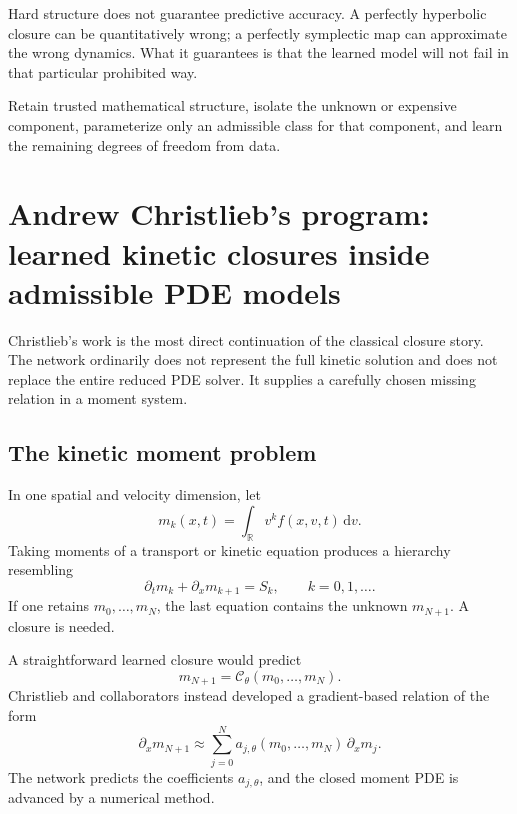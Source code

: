 \documentclass[11pt]{article}
\newcommand{\R}{\mathbb{R}}
\newcommand{\C}{\mathcal{C}}
\newcommand{\dd}{\,\mathrm{d}}
\begin{document}
Hard structure does not guarantee predictive accuracy. A perfectly hyperbolic closure can be quantitatively wrong; a perfectly symplectic map can approximate the wrong dynamics. What it guarantees is that the learned model will not fail in that particular prohibited way.

\begin{takeaway}
Retain trusted mathematical structure, isolate the unknown or expensive component, parameterize only an admissible class for that component, and learn the remaining degrees of freedom from data.
\end{takeaway}

\section{Andrew Christlieb's program: learned kinetic closures inside admissible PDE models}

Christlieb's work is the most direct continuation of the classical closure story. The network ordinarily does not represent the full kinetic solution and does not replace the entire reduced PDE solver. It supplies a carefully chosen missing relation in a moment system.

\subsection{The kinetic moment problem}

In one spatial and velocity dimension, let
\begin{equation}
 m_k(x,t)=\int_{\R}v^k f(x,v,t)\dd v.
\end{equation}
Taking moments of a transport or kinetic equation produces a hierarchy resembling
\begin{equation}
 \partial_t m_k+\partial_xm_{k+1}=S_k,
 \qquad k=0,1,\ldots.
\end{equation}
If one retains \(m_0,\ldots,m_N\), the last equation contains the unknown \(m_{N+1}\). A closure is needed.

A straightforward learned closure would predict
\[
 m_{N+1}=\C_\theta(m_0,\ldots,m_N).
\]
Christlieb and collaborators instead developed a gradient-based relation of the form
\begin{equation}
 \partial_xm_{N+1}
 \approx
 \sum_{j=0}^{N}a_{j,\theta}(m_0,\ldots,m_N)\,\partial_xm_j.
 \label{eq:gradientclosure}
\end{equation}
The network predicts the coefficients \(a_{j,\theta}\), and the closed moment PDE is advanced by a numerical method.
\end{document}
